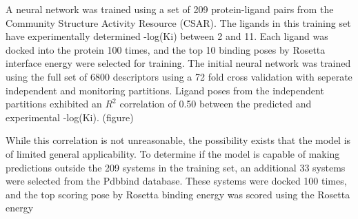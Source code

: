 \documentclass[11pt, oneside]{article}   	%
\begin{document}
A neural network was trained using a set of 209 protein-ligand pairs from the Community Structure Activity Resource (CSAR).  
The ligands in this training set have experimentally determined -log(Ki) between 2 and 11.  
Each ligand was docked into the protein 100 times, and the top 10 binding poses by Rosetta interface energy were selected for training. 
The initial neural network was trained using the full set of 6800 descriptors using a 72 fold cross validation with seperate independent and monitoring partitions.  
Ligand poses from the independent partitions exhibited an $R^{2}$ correlation of 0.50 between the predicted and experimental -log(Ki). (figure)

While this correlation is not unreasonable, the possibility exists that the model is of limited general applicability.  
To determine if the model is capable of making predictions outside the 209 systems in the training set, an additional 33 systems were selected from the Pdbbind database.  
These systems were docked 100 times, and the top scoring pose by Rosetta binding energy was scored using the Rosetta energy 



\end{document}

